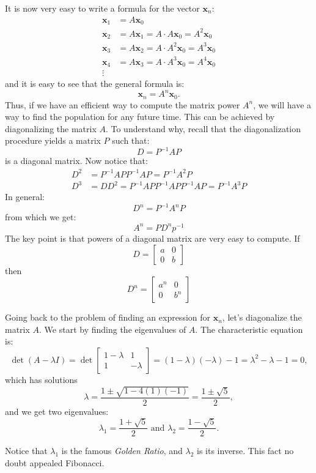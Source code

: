 \documentclass[12pt]{article}
\begin{document}
It is now very easy to write a formula for the vector $\mathbf{x}_n$:
\begin{align*}
\mathbf{x}_{1}&=A\mathbf{x}_0\\
\mathbf{x}_{2}&=A\mathbf{x}_1=A\cdot A\mathbf{x}_0=A^2\mathbf{x}_0\\
\mathbf{x}_{3}&=A\mathbf{x}_2=A\cdot A^2\mathbf{x}_0=A^3\mathbf{x}_0\\
\mathbf{x}_{4}&=A\mathbf{x}_3=A\cdot A^3\mathbf{x}_0=A^4\mathbf{x}_0\\
\vdots&
\end{align*}
and it is easy to see that the general formula is:
\[
\mathbf{x}_{n}=A^n\mathbf{x}_0.
\]
Thus, if we have an efficient way to compute the matrix power $A^n$, we will have a way to find the population for any future time. This can be achieved by diagonalizing the matrix $A$. To understand why, recall that the diagonalization procedure yields a matrix $P$ such that:
\[
D = P^{-1}AP
\]
is a diagonal matrix. Now notice that:
\begin{align*}
D^2&=P^{-1}APP^{-1}AP=P^{-1}A^2P\\
D^3&=DD^2=P^{-1}APP^{-1}APP^{-1}AP=P^{-1}A^3P
\end{align*}
In general:
\[
D^n=P^{-1}A^nP
\]
from which we get:
\[
A^n=PD^np^{-1}
\]
The key point is that powers of a diagonal matrix are very easy to compute. If
$$
D=\begin{bmatrix}a&0\\0&b\end{bmatrix}
$$
then
$$
D^n=\begin{bmatrix}a^n&0\\0&b^n\end{bmatrix}
$$

Going back to the problem of finding an expression for $\mathbf{x}_n$, let's diagonalize the matrix $A$.
We start by finding the eigenvalues of $A$. The characteristic equation is:
\[
\det(A-\lambda I)=\det\begin{bmatrix}1-\lambda&1\\1&-\lambda\end{bmatrix}=(1-\lambda)(-\lambda)-1=\lambda^2-\lambda-1=0,
\]
which has solutions
\[
\lambda=\frac{1\pm\sqrt{1-4(1)(-1)}}{2}=\frac{1\pm\sqrt{5}}{2},
\]
and we get two eigenvalues:
\[
\lambda_1=\frac{1+\sqrt{5}}{2}\text{ and } \lambda_2=\frac{1-\sqrt{5}}{2}.
\]

Notice that $\lambda_1$ is the famous \emph{Golden Ratio}, and $\lambda_2$ is its inverse. This fact no doubt appealed Fibonacci.
\end{document}
